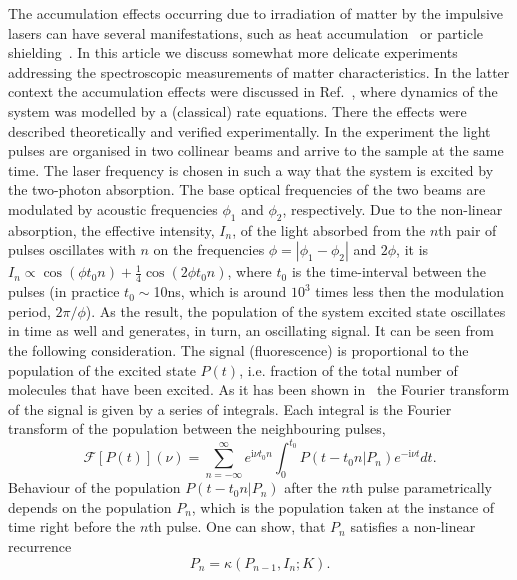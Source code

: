 \documentclass[prb,twocolumn,showpacs,epsfig,epsf]{revtex4}
\newcommand{\abs}[1]{\left\vert#1\right\vert}
\renewcommand{\i}{\mathrm{i}}
\newcommand{\1}{\mathds{1}}
\begin{document}
The accumulation effects occurring due to irradiation of matter by the impulsive lasers can have several manifestations, such as heat accumulation~\cite{TPV2009} or particle shielding~\cite{NJSH2014}. In this article we discuss somewhat more delicate experiments addressing the spectroscopic measurements of matter characteristics. In the latter context the accumulation effects were discussed in Ref.~\cite{our}, where dynamics of the system was modelled by a (classical) rate equations. There the effects were described theoretically and verified experimentally. In the experiment the light pulses are organised in two collinear beams and arrive to the sample at the same time. The laser frequency is chosen in such a way that the system is excited by the two-photon absorption. The base optical frequencies of the two beams are modulated by acoustic frequencies $\phi_1$ and $\phi_2$, respectively. Due to the non-linear absorption, the effective intensity, $I_n$, of the light absorbed from the $n$th pair of pulses oscillates with $n$ on the frequencies $\phi=\abs{\phi_1-\phi_2}$ and  $2\phi$, it is $I_n\propto  \cos( \phi t_0 n)+ \frac{1}{4} \cos( 2\phi t_0 n)$, where $t_0$ is the time-interval between the pulses (in practice $t_0\sim$10ns, which is around $10^3$ times less then the modulation period, $2\pi/\phi$). As the result, the population of the system excited state oscillates in time as well and generates, in turn, an oscillating signal. It can be seen from the following consideration. The signal (fluorescence) is proportional to the population of the excited state $P(t)$, i.e. fraction of the total number of molecules that have been excited. As it has been shown in~\cite{our} %
the Fourier transform of the signal is given by a series of integrals. Each integral is the Fourier transform of the population between the neighbouring pulses, 
{\small \begin{equation}
\mathcal{F}\left[P(t)\right](\nu)=\sum_{n=-\infty}^\infty e^{\i \nu t_0 n}\int_{0}^{t_0} P(t-t_0 n| P_n)e^{-\i \nu t}dt.
\end{equation}
}
Behaviour of the population $P(t-t_0 n| P_n)$ after the $n$th pulse parametrically depends on the population $P_n$, which is the population taken at the instance of time right before the $n$th pulse.
One can show, that $P_n$ satisfies a non-linear recurrence 
\begin{equation}\label{recPn}
P_{n}=\kappa(P_{n-1},I_{n};K).
\end{equation}
\end{document}
